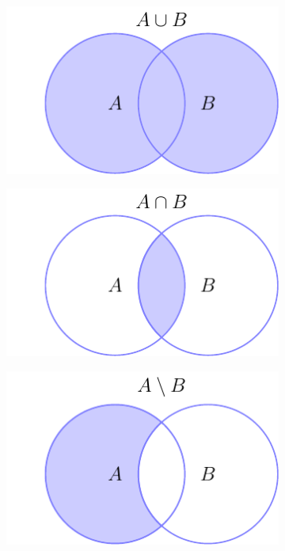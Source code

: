\begin{figure}[t]
\centering
    \begin{subfigure}[t]{0.45\textwidth}
    \includegraphics[width=\textwidth]{figures/math/set_theory/set_venn_or.pdf}
    \end{subfigure}
    \begin{subfigure}[t]{0.45\textwidth}
    \includegraphics[width=\textwidth]{figures/math/set_theory/set_venn_and.pdf}
    \end{subfigure}

    \begin{subfigure}[t]{0.45\textwidth}
    \includegraphics[width=\textwidth]{figures/math/set_theory/set_venn_minus.pdf}
    \end{subfigure}


\end{figure}
